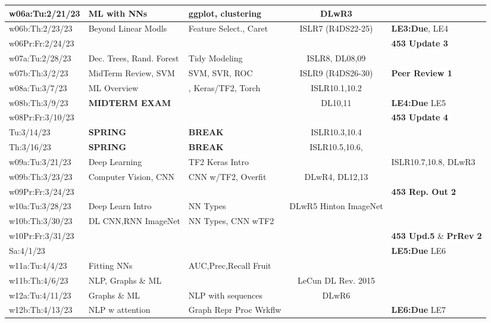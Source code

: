 \documentclass[10pt]{article} %
\begin{document}
\begin{table}[h]
\begin{tabular}{| l | p{3.9cm} | p{3.7cm} | c | p{2.8cm} |}
    \hline
    \hline
    w06a:Tu:2/21/23 & ML with NNs & ggplot, clustering & DLwR3 & \\
    \hline
    w06b:Th:2/23/23 & Beyond Linear Modls & Feature Select., Caret & ISLR7 (R4DS22-25) & {\bf LE3:Due}, LE4 \\
    \hline
    w06Pr:Fr:2/24/23 &  &  &  & {\bf 453 Update 3} \\
    \hline
    \hline
    w07a:Tu:2/28/23 & Dec. Trees, Rand. Forest & Tidy Modeling & ISLR8, DL08,09 &  \\
    \hline
    w07b:Th:3/2/23 & MidTerm Review, SVM & SVM, SVR, ROC & ISLR9 (R4DS26-30) & {\bf Peer Review 1} \\
    \hline
    \hline
    w08a:Tu:3/7/23 & ML Overview & , Keras/TF2, Torch & ISLR10.1,10.2 &  \\
    \hline
    w08b:Th:3/9/23 & {\bf MIDTERM EXAM} &  & DL10,11 & {\bf LE4:Due} LE5 \\
    \hline
    w08Pr:Fr:3/10/23 &  & &  & {\bf 453 Update 4} \\
    \hline
    \hline
    Tu:3/14/23 & {\bf SPRING} & {\bf BREAK} & ISLR10.3,10.4 &   \\
    \hline
    Th:3/16/23 & {\bf SPRING} & {\bf BREAK} & ISLR10.5,10.6,  &  \\
    \hline
    \hline
    w09a:Tu:3/21/23 & Deep Learning & TF2 Keras Intro &  & ISLR10.7,10.8, DLwR3 \\
    \hline
    w09b:Th:3/23/23 & Computer Vision, CNN & CNN w/TF2, Overfit &DLwR4, DL12,13 &  \\
    \hline
    w09Pr:Fr:3/24/23 &  & &  & {\bf 453 Rep. Out 2} \\
    \hline
    \hline
    w10a:Tu:3/28/23 & Deep Learn Intro & NN Types & DLwR5 Hinton ImageNet & \\
    \hline
    w10b:Th:3/30/23 & DL CNN,RNN ImageNet & NN Types, CNN wTF2 &   & \\
    \hline
    w10Pr:Fr:3/31/23 & &  & & {\bf 453 Upd.5} \& {\bf PrRev 2} \\
    \hline
    Sa:4/1/23 & & & & {\bf LE5:Due} LE6 \\
    \hline
    \hline
    w11a:Tu:4/4/23 & Fitting NNs  & AUC,Prec,Recall Fruit &  &  \\
    \hline
    w11b:Th:4/6/23 & NLP, Graphs \& ML &  & LeCun DL Rev. 2015 & \\
    \hline
    \hline
    w12a:Tu:4/11/23 & Graphs \& ML & NLP with sequences   & DLwR6 &  \\
    \hline
    w12b:Th:4/13/23 & NLP w attention & Graph Repr Proc Wrkflw &  & {\bf LE6:Due} LE7 \\

\end{tabular}
\end{table}
\end{document}
